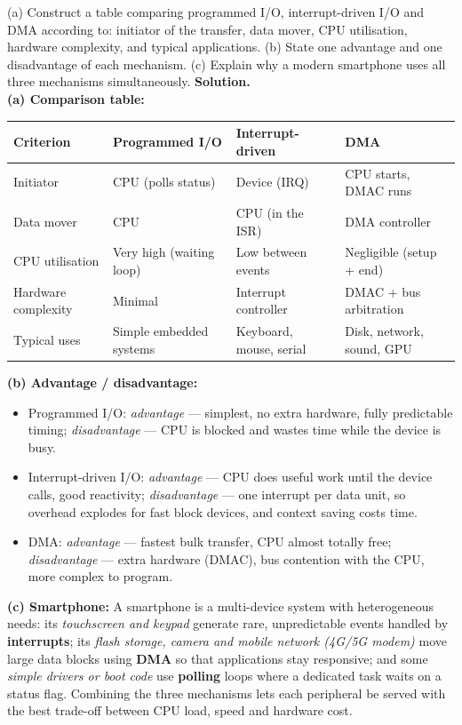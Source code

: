 \documentclass[11pt]{article}
\begin{document}
\begin{exoresolu}
(a) Construct a table comparing programmed I/O, interrupt-driven I/O and DMA according to: initiator of the transfer, data mover, CPU utilisation, hardware complexity, and typical applications. (b) State one advantage and one disadvantage of each mechanism. (c) Explain why a modern smartphone uses all three mechanisms simultaneously.
\tcblower
\textbf{Solution.}\\
\textbf{(a) Comparison table:}
\begin{center}
\begin{tabularx}{\linewidth}{|l|X|X|X|}
\hline
\rowcolor{popblueL} \textbf{Criterion} & \textbf{Programmed I/O} & \textbf{Interrupt-driven} & \textbf{DMA} \\
\hline
Initiator & CPU (polls status) & Device (IRQ) & CPU starts, DMAC runs \\
\hline
Data mover & CPU & CPU (in the ISR) & DMA controller \\
\hline
CPU utilisation & Very high (waiting loop) & Low between events & Negligible (setup + end) \\
\hline
Hardware complexity & Minimal & Interrupt controller & DMAC + bus arbitration \\
\hline
Typical uses & Simple embedded systems & Keyboard, mouse, serial & Disk, network, sound, GPU \\
\hline
\end{tabularx}
\end{center}
\textbf{(b) Advantage / disadvantage:}
\begin{itemize}
\item Programmed I/O: \emph{advantage} --- simplest, no extra hardware, fully predictable timing; \emph{disadvantage} --- CPU is blocked and wastes time while the device is busy.
\item Interrupt-driven I/O: \emph{advantage} --- CPU does useful work until the device calls, good reactivity; \emph{disadvantage} --- one interrupt per data unit, so overhead explodes for fast block devices, and context saving costs time.
\item DMA: \emph{advantage} --- fastest bulk transfer, CPU almost totally free; \emph{disadvantage} --- extra hardware (DMAC), bus contention with the CPU, more complex to program.
\end{itemize}
\textbf{(c) Smartphone:} A smartphone is a multi-device system with heterogeneous needs: its \emph{touchscreen and keypad} generate rare, unpredictable events handled by \textbf{interrupts}; its \emph{flash storage, camera and mobile network (4G/5G modem)} move large data blocks using \textbf{DMA} so that applications stay responsive; and some \emph{simple drivers or boot code} use \textbf{polling} loops where a dedicated task waits on a status flag. Combining the three mechanisms lets each peripheral be served with the best trade-off between CPU load, speed and hardware cost.
\end{exoresolu}
\end{document}
